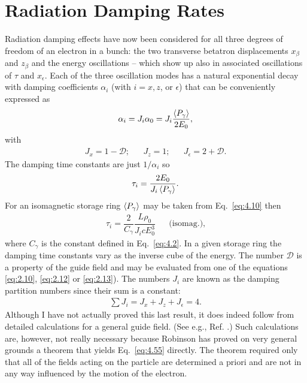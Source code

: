 \section{Radiation Damping Rates}\label{sec:4.4}

Radiation damping effects have now been considered for all three degrees of freedom of an electron in a bunch: the two transverse betatron displacements $x_\beta$ and $z_\beta$ and the energy oscillations -- which show up also in associated oscillations of $\tau$ and $x_\epsilon$. Each of the three oscillation modes has a natural exponential decay with damping coefficients $\alpha_i$ (with $i = x, z$, or $\epsilon$) that can be conveniently expressed as
\begin{align}
	\alpha_i = J_i \alpha_0 = J_i \dfrac{\left< P_\gamma \right>}{2 E_0},
\end{align}
with
\begin{align}
	J_x = 1 - \mathscr{D};&& J_z = 1;&& J_\epsilon = 2 + \mathscr{D}.
\end{align}
The damping time constants are just $1/\alpha_i$ so
\begin{align} \label{eq:4.53}
	\tau_i = \dfrac{2 E_0}{J_i \left< P_\gamma \right>}.
\end{align}
For an isomagnetic storage ring $\left< P_\gamma \right>$ may be taken from Eq.~\eqref{eq:4.10} then
\begin{align} \label{eq:4.54}
	\tau_i = \dfrac{2}{C_\gamma} \dfrac{L \rho_0}{J_i c E_0^3} && \text{(isomag.)},
\end{align}
where $C_\gamma$ is the constant defined in Eq.~\ref{eq:4.2}. In a given storage ring the damping
time constants vary as the inverse cube of the energy. The number $\mathscr{D}$ is a property
 of the guide field and may be evaluated from one of the equations \eqref{eq:2.10}, \eqref{eq:2.12}
 or \eqref{eq:2.13}). The numbers $J_i$ are known as the damping partition numbers since their sum is a constant:
\begin{align} \label{eq:4.55}
	\sum J_i = J_x + J_z + J_\epsilon = 4.
\end{align}
Although I have not actually proved this last result, it does indeed follow from detailed calculations for a general guide field. (See e.g., Ref. \cite{5}.) Such calculations are, however, not really necessary because Robinson has proved on very general grounds a theorem that yields Eq.~\eqref{eq:4.55} directly. The theorem required only that all of the fields acting on the particle are determined a priori and are not in any way influenced by the motion of the electron.
